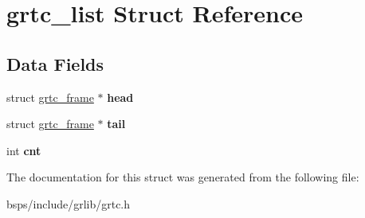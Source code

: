 \hypertarget{structgrtc__list}{}\section{grtc\+\_\+list Struct Reference}
\label{structgrtc__list}
\subsection*{Data Fields}
\begin{DoxyCompactItemize}
\item 
\mbox{\label{structgrtc__list_a4cefcaec9fe1a4ae38de261a57911e8a}} 
struct \mbox{\hyperlink{structgrtc__frame}{grtc\+\_\+frame}} $\ast$ {\bfseries head}
\item 
\mbox{\label{structgrtc__list_ad7c3b593844a2ab0519b916d8bdc87b7}} 
struct \mbox{\hyperlink{structgrtc__frame}{grtc\+\_\+frame}} $\ast$ {\bfseries tail}
\item 
\mbox{\label{structgrtc__list_a52ae8830122e7c6f7fcb701cd12b6b38}} 
int {\bfseries cnt}
\end{DoxyCompactItemize}


The documentation for this struct was generated from the following file\+:\begin{DoxyCompactItemize}
\item 
bsps/include/grlib/grtc.\+h\end{DoxyCompactItemize}
